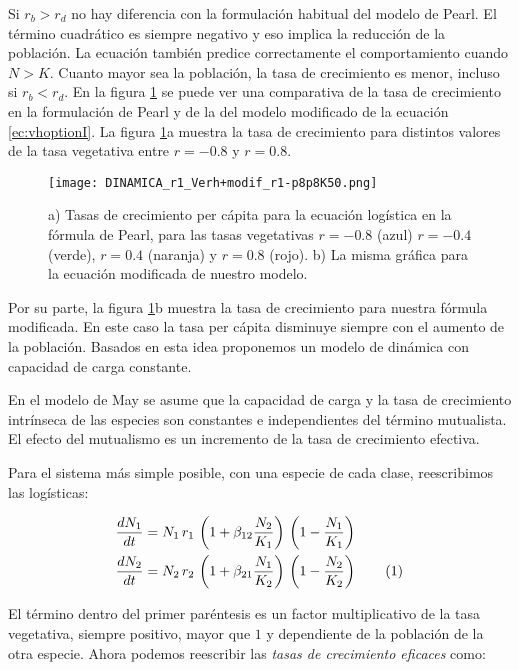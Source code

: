 Si $r_b > r_d$ no hay diferencia con la formulación habitual del modelo de Pearl. El término cuadrático es siempre negativo y eso implica la reducción de la población. La ecuación también predice correctamente el comportamiento cuando $N>K$. Cuanto mayor sea la población, la tasa de crecimiento es menor, incluso si $r_b < r_d$. En la figura \ref{fig:r_equiv_Verh+modif} se puede ver una comparativa de la tasa de crecimiento en la formulación de Pearl y de la del modelo modificado de la ecuación \ref{ec:vhoptionI}. La figura \ref{fig:r_equiv_Verh+modif}a muestra la tasa de crecimiento para distintos valores de la tasa vegetativa entre $r=-0.8$ y $r=0.8$.
 
 
\begin{figure}[ht]
\centering
\texttt{[image: DINAMICA\_r1\_Verh+modif\_r1-p8p8K50.png]}
\caption{a) Tasas de crecimiento per cápita para la ecuación logística en la fórmula de Pearl, para las tasas vegetativas $r=-0.8$ (azul)
$r=-0.4$ (verde), $r=0.4$ (naranja) y $r=0.8$ (rojo). b) La misma gráfica para la ecuación modificada de nuestro modelo.}
\label{fig:r_equiv_Verh+modif}
\end{figure}

Por su parte, la figura \ref{fig:r_equiv_Verh+modif}b muestra la tasa de crecimiento para nuestra fórmula modificada. En este caso la tasa per cápita disminuye siempre con el aumento de la población. Basados en esta idea proponemos un modelo de dinámica con capacidad de carga constante.

En el modelo de May se asume que la capacidad de carga y la tasa de crecimiento intrínseca de las especies son constantes e independientes del término mutualista. El efecto del mutualismo es un incremento de la tasa de crecimiento efectiva.

Para el sistema más simple posible, con una especie de cada clase, reescribimos las logísticas:

\begin{align*}
\displaystyle & \frac{dN_1}{dt}= N_1 \, r_1\, \left(1 + \beta_{12}\frac{N_2}{K_1} \right) \, \left(1-\frac{N_1}{K_1}\right) \\
\displaystyle & \frac{dN_2}{dt}=N_2 \, r_2\, \left(1 + \beta_{21}\frac{N_1}{K_2} \right) \, \left(1-\frac{N_2}{K_2}\right)
\stepcounter{equation}\tag{\theequation}
\label{myeq3}
\end{align*}

El término dentro del primer paréntesis es un factor multiplicativo de la tasa vegetativa, siempre positivo, mayor que $1$ y dependiente de la población de la otra especie.
Ahora podemos reescribir las \textit{tasas de crecimiento eficaces} como:


